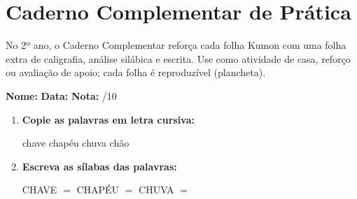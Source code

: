 
\chapter{Caderno Complementar de Prática}

No 2º ano, o Caderno Complementar reforça cada folha Kumon com uma folha extra de caligrafia, análise silábica e escrita. Use como atividade de casa, reforço ou avaliação de apoio; cada folha é reproduzível (plancheta).



\begin{exercicio}



\noindent\textbf{Nome:} \underline{\hspace{3.2cm}} \quad \textbf{Data:} \underline{\hspace{1.6cm}} \quad \textbf{Nota:} \underline{\hspace{0.9cm}}/10


\begin{enumerate}

  \item \textbf{Copie as palavras em letra cursiva:}
  \begin{center}
  chave \quad chapéu \quad chuva \quad chão
  \end{center}
  \begin{center}
  \underline{\hspace{2.4cm}} \quad \underline{\hspace{2.4cm}} \quad \underline{\hspace{2.4cm}} \quad \underline{\hspace{2.4cm}}
  \end{center}

  \item \textbf{Escreva as sílabas das palavras:}
  \begin{center}
  CHAVE $=$ \underline{\hspace{1.5cm}} \underline{\hspace{1.5cm}} \quad CHAPÉU $=$ \underline{\hspace{1.5cm}} \underline{\hspace{1.5cm}} \quad CHUVA $=$ \underline{\hspace{1.5cm}} \underline{\hspace{1.5cm}}
  \end{center}


\end{enumerate}
\end{exercicio}

